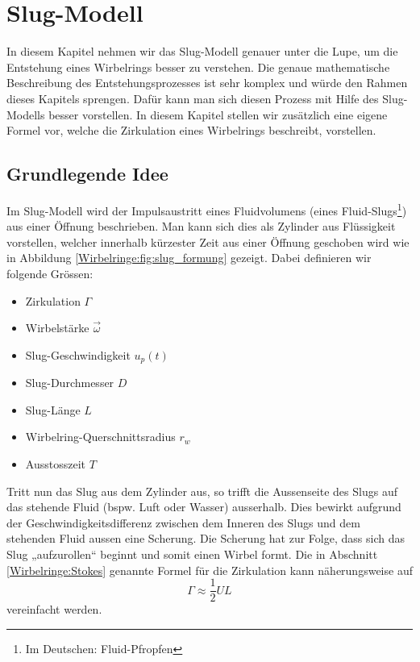 %
%
%
\section{Slug-Modell}
In diesem Kapitel nehmen wir das Slug-Modell genauer unter die Lupe, um die Entstehung eines Wirbelrings besser zu verstehen.
Die genaue mathematische Beschreibung des Entstehungsprozesses ist sehr komplex und würde den Rahmen dieses Kapitels sprengen.
Dafür kann man sich diesen Prozess mit Hilfe des Slug-Modells besser vorstellen.
In diesem Kapitel stellen wir zusätzlich eine eigene Formel vor, welche die Zirkulation eines Wirbelrings beschreibt, vorstellen.

\subsection{Grundlegende Idee}
Im Slug-Modell wird der Impulsaustritt eines Fluidvolumens (eines Fluid-Slugs\footnote{Im Deutschen: Fluid-Pfropfen}) aus einer Öffnung beschrieben.
Man kann sich dies als Zylinder aus Flüssigkeit vorstellen, welcher innerhalb kürzester Zeit aus einer Öffnung geschoben wird wie in Abbildung \ref{Wirbelringe:fig:slug_formung} gezeigt.
Dabei definieren wir folgende Grössen:
\begin{itemize}
    \item Zirkulation \(\Gamma\)
    \item Wirbelstärke \(\vec{\omega}\)
    \item Slug-Geschwindigkeit \(u_p(t)\)
    \item Slug-Durchmesser \(D\)
    \item Slug-Länge \(L\)
    \item Wirbelring-Querschnittsradius \(r_w\)
    \item Ausstosszeit \(T\)
\end{itemize}



Tritt nun das Slug aus dem Zylinder aus, so trifft die Aussenseite des Slugs auf das stehende Fluid (bspw. Luft oder Wasser) ausserhalb.
Dies bewirkt aufgrund der Geschwindigkeitsdifferenz zwischen dem Inneren des Slugs und dem stehenden Fluid aussen eine Scherung.
Die Scherung hat zur Folge, dass sich das Slug „aufzurollen“ beginnt und somit einen Wirbel formt.
Die in Abschnitt \ref{Wirbelringe:Stokes} genannte Formel für die Zirkulation kann näherungsweise auf
\begin{equation*}
\Gamma 
\approx 
\frac{1}{2}UL
\end{equation*}
vereinfacht werden.

